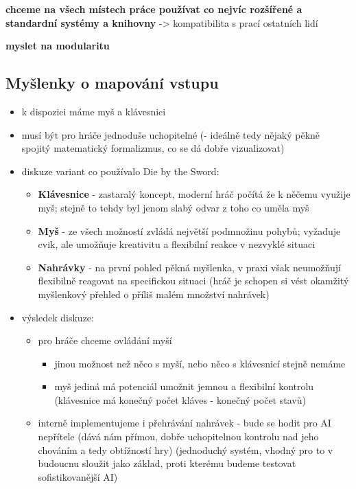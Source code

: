 \textbf{chceme na všech místech práce používat co nejvíc rozšířené a standardní systémy a knihovny} -> kompatibilita s prací ostatních lidí

\textbf{myslet na modularitu}

\subsection{Myšlenky o mapování vstupu}
\begin{itemize}
    \item k dispozici máme myš a klávesnici
    \item musí být pro hráče jednoduše uchopitelné (- ideálně tedy nějaký pěkně spojitý matematický formalizmus, co se dá dobře vizualizovat)
    \item diskuze variant co používalo Die by the Sword:
        \begin{itemize}
            \item \textbf{Klávesnice} - zastaralý koncept, moderní hráč počítá že k něčemu využije myš; stejně to tehdy byl jenom slabý odvar z toho co uměla myš
            \item \textbf{Myš} - ze všech možností zvládá největší podmnožinu pohybů; vyžaduje cvik, ale umožňuje kreativitu a flexibilní reakce v nezvyklé situaci
            \item \textbf{Nahrávky} - na první pohled pěkná myšlenka, v praxi však neumožňují flexibilně reagovat na specifickou situaci (hráč je schopen si vést okamžitý myšlenkový přehled o příliš malém množství nahrávek)
        \end{itemize}
    \item výsledek diskuze:
        \begin{itemize}
            \item pro hráče chceme ovládání myší
            \begin{itemize}
                \item jinou možnost než něco s myší, nebo něco s klávesnicí stejně nemáme
                \item myš jediná má potenciál umožnit jemnou a flexibilní kontrolu (klávesnice má konečný počet kláves - konečný počet stavů)
            \end{itemize}
            \item interně implementujeme i přehrávání nahrávek - bude se hodit pro AI nepřítele (dává nám přímou, dobře uchopitelnou kontrolu nad jeho chováním a tedy obtížností hry) (jednoduchý systém, vhodný pro to v budoucnu sloužit jako základ, proti kterému budeme testovat sofistikovanější AI)

\end{itemize}
\end{itemize}
